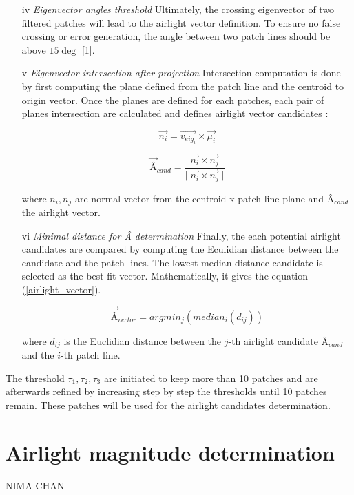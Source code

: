 \documentclass[conference]{IEEEtran}
\begin{document}
\begin{itemize}[]
\item[iv] \textit{Eigenvector angles threshold} Ultimately, the crossing eigenvector of two filtered patches will lead to the 
airlight vector definition.  To ensure no false crossing or error generation, the angle between two patch lines should be above 
$15 \deg$ [1].
\item[v] \textit{Eigenvector intersection after projection}  Intersection computation is done by first computing the plane defined
 from the patch line and the centroid to origin vector.  Once the planes are defined for each patches, each pair of planes 
 intersection are calculated and defines airlight vector candidates :

\begin{equation}
\label{Normal_vector}
\vec{n_i} = \vec{v_{eig_i}} \times \vec{\mu_i}
\end{equation}

\begin{equation}
\label{airlight_candidate}
\vec{\text{Â}}_{cand} = \frac{\vec{n_i} \times \vec{n_j}}{||\vec{n_i} \times \vec{n_j}||} 
\end{equation}

where $n_i, n_j$ are normal vector from the {centroid x patch line} plane and $\text{Â}_{cand}$ the airlight vector.
\item[vi] \textit{Minimal distance for Â determination} Finally, the each potential airlight candidates are compared by 
computing the Eculidian distance between the candidate and the patch lines.  The lowest median distance candidate is selected as 
the best fit vector.  Mathematically, it gives the equation (\ref{airlight_vector}).

\begin{equation}
\label{airlight_vector}
\vec{\text{Â}}_{vector} = argmin_j(median_i(d_{ij})) 
\end{equation}

where $d_{ij}$ is the Euclidian distance between the $j$-th airlight candidate $\text{Â}_{cand}$ and the $i$-th patch line.
\end{itemize}   

The threshold $\tau_1, \tau_2, \tau_3$ are initiated to keep more than 10 patches and are afterwards refined by increasing step
by step the thresholds until 10 patches remain.  These patches will be used for the airlight candidates determination.

\section{Airlight magnitude determination}
NIMA CHAN
\end{document}
